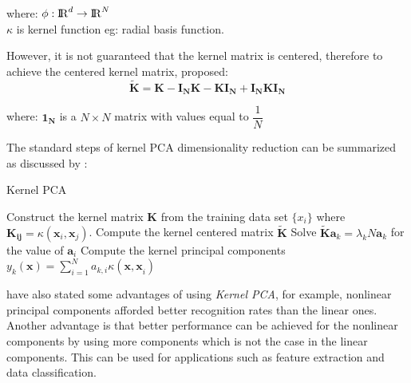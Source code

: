\begin{center}
	where: $\phi :{\rm I\!R}^d \rightarrow {\rm I\!R}^N $\\
	$\kappa$ is kernel function eg: radial basis function.
\end{center}
However, it is not guaranteed that the kernel matrix is centered, therefore to achieve the centered kernel matrix, \cite{scholkopf1998nonlinear} proposed:
\begin{equation}
\mathbf{\tilde{K} = K -I_NK-KI_N+I_NKI_N}
\end{equation} 
\begin{center}
	where: $\mathbf{1_N}$ is a $N\times N$ matrix with values equal to $\dfrac{1}{N}$
\end{center}
The standard steps of kernel PCA dimensionality reduction can be summarized as discussed by \cite{wang2012kernel}:
\begin{algorithm}[H]
	\caption{Kernel PCA}\label{kernelpca}
	\begin{algorithmic}[1]
		\State Construct the kernel matrix $\mathbf{K}$ from the training data set $\{\mathit{x_i}\}$ where $\mathbf{K_{ij}} = \mathit{\kappa(\mathbf{x}_i,\mathbf{x}_j)}$.
		\State Compute the kernel centered matrix  $\mathbf{\tilde{K}}$
		\State Solve $ \mathbf{\tilde{K} a}_\mathit{k} = \lambda_k N \mathbf{a}_\mathit{k}$ for the value of $\mathbf{a}_\mathit{i}$
		\State Compute  the  kernel  principal  components $y_k(\mathbf{x}) = \sum_{i=1}^{N} a_{k,i}\kappa(\mathbf{x,x}_i)$
	\end{algorithmic}
\end{algorithm}
\cite{scholkopf1997kernel} have also stated some advantages of using \textit{Kernel PCA}, for example, nonlinear principal components afforded better recognition rates than the linear ones. Another advantage is that better performance can be achieved for the nonlinear components by using more components which is not the case in the linear components. This can be used for applications such as feature extraction and data classification. 
